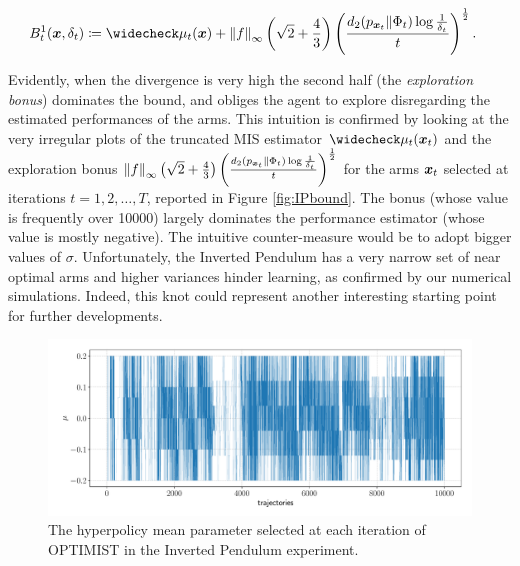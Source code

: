 \begin{align}
	&B_t^{1}(\vx,\delta_t) \coloneqq 
	\wc{\mu}_t(\vx)+\norm[\infty]{f}\left(\sqrt{2}+\frac{4}{3}\right)\left(\frac{d_{2}(p_{\vx_t}\|\Phi_{t})\log\frac{1}{\delta_t}}{t}\right)^{\frac{1}{2}}.
\end{align}

Evidently, when the \Renyi divergence is very high the second half (the \emph{exploration bonus}) dominates the bound, and obliges the agent to explore disregarding the estimated performances of the arms. This intuition is confirmed by looking at the very irregular plots of the truncated \gls{MIS} estimator $\wc{\mu}_t(\vx_t)$ and the exploration bonus $\norm[\infty]{f}\left(\sqrt{2}+\frac{4}{3}\right)\left(\frac{d_{2}(p_{\vx_t}\|\Phi_{t})\log\frac{1}{\delta_t}}{t}\right)^{\frac{1}{2}}$ for the arms $\vx_t$ selected at iterations $t=1,2,\dots,T$, reported in Figure \ref{fig:IPbound}. The bonus (whose value is frequently over 10000) largely dominates the performance estimator (whose value is mostly negative). The intuitive counter-measure would be to adopt bigger values of $\sigma$. Unfortunately, the Inverted Pendulum has a very narrow set of near optimal arms and higher variances hinder learning, as confirmed by our numerical simulations. Indeed, this knot could represent another interesting starting point for further developments.

\begin{figure}[t!] 
\centering
\includegraphics[width=\textwidth,keepaspectratio]{Images/IP_mu_1.pdf}
\caption{The hyperpolicy mean parameter selected at each iteration of \gls{OPTIMIST} in the Inverted Pendulum experiment.} 
\label{fig:IPmu1}
\end{figure}

